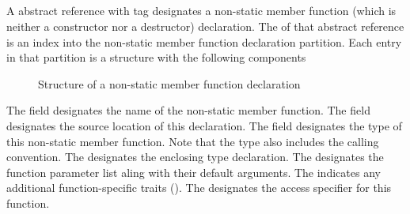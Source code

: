 \subsection{} 
\label{sec:ifc:DeclSort:Method}

A  abstract reference with tag  designates a non-static member function (which is neither a constructor nor a destructor) declaration.
The  of that abstract reference is an index into the non-static member function declaration partition.
Each entry in that partition is a structure with the following components
%
\begin{figure}[H]
	\centering
	\caption{Structure of a non-static member function declaration}
	\label{fig:ifc-method-decl-structure}
\end{figure}
%
The  field designates the name of the non-static member function.
The  field designates the source location of this declaration.
The  field designates the type of this non-static member function.  Note that the type also includes the calling convention.
The  designates the enclosing type declaration.
The  designates the function parameter list aling with their default arguments.
The  indicates any additional function-specific traits ().
The  designates the access specifier for this function.



\subsection{} 
\label{sec:ifc:DeclSort:Constructor}

